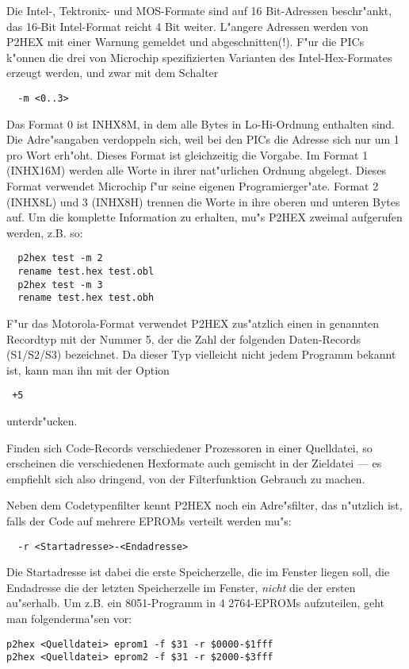 \documentclass[12pt,a4paper,twoside]{report}
\newcommand{\ii}[1]{{\it #1}}
\begin{document}
{Die Intel-, Tektronix- und MOS-Formate sind auf 16 Bit-Adressen
beschr"ankt, das 16-Bit Intel-Format reicht 4 Bit weiter.  L"angere
Adressen werden von P2HEX mit einer Warnung gemeldet und abgeschnitten(!).
F"ur die PICs k"onnen die drei von Microchip spezifizierten Varianten des
Intel-Hex-Formates erzeugt werden, und zwar mit dem Schalter
\begin{verbatim}
  -m <0..3>
\end{verbatim}
Das Format 0 ist INHX8M, in dem alle Bytes in Lo-Hi-Ordnung enthalten
sind.  Die Adre"sangaben verdoppeln sich, weil bei den PICs die Adresse
sich nur um 1 pro Wort erh"oht.  Dieses Format ist gleichzeitig die Vorgabe.
Im Format 1 (INHX16M) werden alle Worte in ihrer nat"urlichen Ordnung
abgelegt.  Dieses Format verwendet Microchip f"ur seine eigenen
Programierger"ate.  Format 2 (INHX8L) und 3 (INHX8H) trennen die Worte
in ihre oberen und unteren Bytes auf.  Um die komplette Information zu
erhalten, mu"s P2HEX zweimal aufgerufen werden, z.B. so:
\begin{verbatim}
  p2hex test -m 2
  rename test.hex test.obl
  p2hex test -m 3
  rename test.hex test.obh
\end{verbatim}
F"ur das Motorola-Format verwendet P2HEX zus"atzlich einen in \cite{CPM68K}
genannten Recordtyp mit der Nummer 5, der die Zahl der folgenden
Daten-Records (S1/S2/S3) bezeichnet.  Da dieser Typ vielleicht nicht jedem
Programm bekannt ist, kann man ihn mit der Option
\begin{verbatim}
 +5
\end{verbatim}
unterdr"ucken.
\par
Finden sich Code-Records verschiedener Prozessoren in einer Quelldatei,
so erscheinen die verschiedenen Hexformate auch gemischt in der Zieldatei
--- es empfiehlt sich also dringend, von der Filterfunktion Gebrauch zu
machen.
\par
Neben dem Codetypenfilter kennt P2HEX noch ein Adre"sfilter, das n"utzlich
ist, falls der Code auf mehrere EPROMs verteilt werden mu"s:
\begin{verbatim}
  -r <Startadresse>-<Endadresse>
\end{verbatim}
Die Startadresse ist dabei die erste Speicherzelle, die im Fenster liegen
soll, die Endadresse die der letzten Speicherzelle im Fenster, \ii{nicht}
die der ersten au"serhalb.  Um z.B. ein 8051-Programm in 4 2764-EPROMs
aufzuteilen, geht man folgenderma"sen vor:
\begin{verbatim}
p2hex <Quelldatei> eprom1 -f $31 -r $0000-$1fff
p2hex <Quelldatei> eprom2 -f $31 -r $2000-$3fff

\end{verbatim}}
\end{document}
